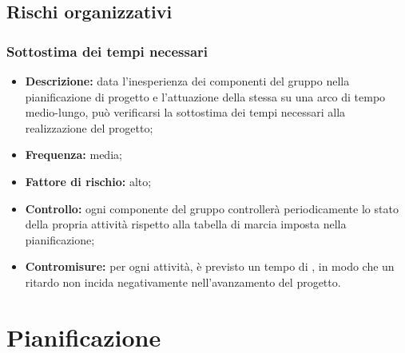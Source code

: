 \documentclass[./PianodiProgetto.tex]{subfiles}
\begin{document}
\section{Rischi organizzativi}
\subsection{Sottostima dei tempi necessari}
\begin{itemize}
	\item \textbf{Descrizione:} data l'inesperienza dei componenti del gruppo nella pianificazione di progetto e l'attuazione della stessa su una arco di tempo medio-lungo, può verificarsi la sottostima dei tempi necessari alla realizzazione del progetto;
	\item \textbf{Frequenza:} media;
	\item \textbf{Fattore di rischio:} alto;
	\item \textbf{Controllo:} ogni componente del gruppo controllerà periodicamente lo stato della propria attività rispetto alla tabella di marcia imposta nella pianificazione;
	\item \textbf{Contromisure:} per ogni attività, è previsto un tempo di , in modo che un ritardo non incida negativamente nell'avanzamento del progetto.
\end{itemize}

\chapter{Pianificazione}
\end{document}
